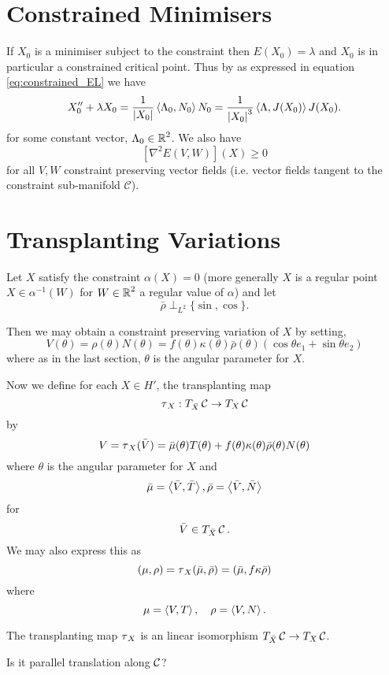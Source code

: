 \documentclass[12pt]{article}
\begin{document}
\section{Constrained Minimisers}

If \(X_0\) is a minimiser subject to the constraint then \(E(X_0) = \lambda\) and \(X_0\) is in particular a constrained critical point. Thus by  as expressed in equation \eqref{eq:constrained_EL} we have
\[
X_0'' + \lambda X_0 = \frac{1}{\left|{X_0}\right|} \left\langle{\Lambda_0},{N_0}\right\rangle N_0 = \frac{1}{\left|{X_0}\right|^3} \left\langle{\Lambda},{J(X_0)}\right\rangle J(X_0).
\]
for some constant vector, \(\Lambda_0 \in \operatorname{\mathbb{R}}^2\). We also have
\begin{equation}
\label{eq:hessian_minimiser_positive}
[\nabla^2 E(V, W)] (X) \geq 0
\end{equation}
for all \(V, W\) constraint preserving vector fields (i.e. vector fields tangent to the constraint sub-manifold \(\mathcal{C}\)).

\section{Transplanting Variations}

Let \(X\) satisfy the constraint \(\alpha(X) = 0\) (more generally \(X\) is a regular point \(X \in \alpha^{-1} (W)\) for \(W \in \operatorname{\mathbb{R}}^2\) a regular value of \(\alpha\)) and let
\[
\bar{\rho} \perp_{L^2} \{\sin, \cos\}.
\]

Then we may obtain a constraint preserving variation of \(X\) by setting,
\[
V(\theta) = \rho(\theta) N(\theta) = f(\theta) \kappa(\theta) \bar{\rho}(\theta) (\cos\theta e_1 + \sin\theta e_2)
\]
where as in the last section, \(\theta\) is the angular parameter for \(X\).

Now we define for each \(X \in H'\), the transplanting map
\[
\operatorname{\tau}_X : T_{\bar{X}} \operatorname{\mathcal{C}} \to T_X \operatorname{\mathcal{C}}
\]
by
\[
V = \operatorname{\tau}_X(\bar{V}) = \bar{\mu}(\theta) T(\theta) + f(\theta)\kappa(\theta)\bar{\rho}(\theta) N(\theta)
\]
where \(\theta\) is the angular parameter for \(X\) and
\[
\bar{\mu} = \left\langle{\bar{V}},{\bar{T}}\right\rangle, \bar{\rho} = \left\langle{\bar{V}},{\bar{N}}\right\rangle
\]
for
\[
\bar{V} \in T_{\bar{X}} \operatorname{\mathcal{C}}.
\]
We may also express this as
\[
(\mu, \rho) = \operatorname{\tau}_X(\bar{\mu}, \bar{\rho}) = (\bar{\mu}, f\kappa\bar{\rho})
\]
where
\[
\mu = \left\langle{V},{T}\right\rangle, \quad \rho = \left\langle{V},{N}\right\rangle.
\]

The transplanting map \(\operatorname{\tau}_X\) is an linear isomorphism \(T_{\bar{X}} \operatorname{\mathcal{C}} \to T_X \operatorname{\mathcal{C}}\).

{\color{red} Is it parallel translation along \(\operatorname{\mathcal{C}}\)?}
\end{document}
